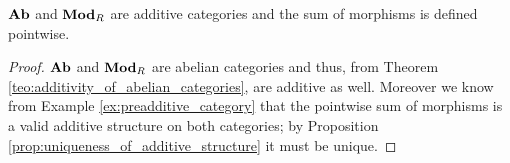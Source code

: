 \begin{corollary}
  \label{corollary:ab_additive}
  \(\text{\normalfont\textbf{Ab}}\) and \(\text{\normalfont\textbf{Mod}}_R\) are additive categories and the sum of morphisms is defined pointwise.
\end{corollary}

\begin{proof}
  \(\text{\normalfont\textbf{Ab}}\) and \(\text{\normalfont\textbf{Mod}}_R\) are abelian categories and thus, from Theorem \ref{teo:additivity_of_abelian_categories}, are additive as well. Moreover we know from Example \ref{ex:preadditive_category} that the pointwise sum of morphisms is a valid additive structure on both categories; by Proposition \ref{prop:uniqueness_of_additive_structure} it must be unique.
\end{proof}
